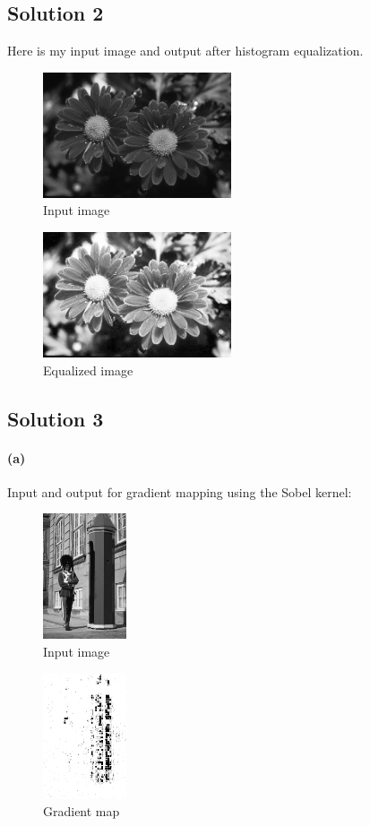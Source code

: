 \documentclass{article}
\newcommand{\solution}[1]{\clearpage \subsection*{Solution #1}}
\newcommand{\spart}[1]{\paragraph{(#1)}}
\begin{document}
\solution{2} Here is my input image and output after histogram equalization.

\begin{figure}[!h]
  \centering
  \includegraphics[height=10em]{code/inputs/p2_inp.png}
  \caption{Input image}
\end{figure}

\begin{figure}[!h]
  \centering
  \includegraphics[height=10em]{code/outputs/prob2.png}
  \caption{Equalized image}
\end{figure}

\solution{3}

\spart{a} Input and output for gradient mapping using the Sobel kernel:

\begin{figure}[!h]
  \centering
  \includegraphics[height=10em]{code/inputs/p3_inp.png}
  \caption{Input image}
\end{figure}

\begin{figure}[!h]
  \centering
  \includegraphics[height=10em]{code/outputs/prob3_a.png}
  \caption{Gradient map}
\end{figure}
\end{document}

